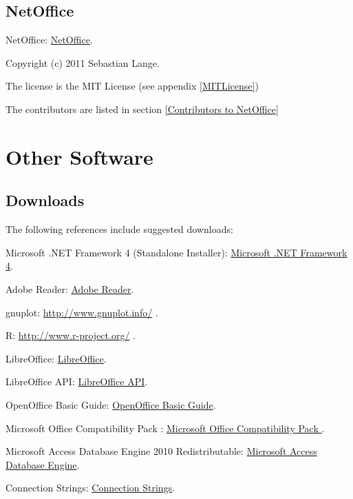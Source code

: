 \subsection{NetOffice}
NetOffice: \href{http://netoffice.codeplex.com/}{NetOffice}. 

Copyright (c) 2011 Sebastian Lange. 

The license is the MIT License (see appendix \ref{MITLicense})

The contributors are listed in section \ref{Contributors to NetOffice}







\newpage
\section{Other Software}



\subsection{Downloads}
The following references include suggested downloads:

Microsoft .NET Framework 4 (Standalone Installer): \href{http://www.microsoft.com/en-us/download/details.aspx?id=17718}{Microsoft .NET Framework 4}.

Adobe Reader: \href{http://get.adobe.com/uk/reader/}{Adobe Reader}.

gnuplot: \href{http://www.gnuplot.info/}{http://www.gnuplot.info/} .

R: \href{http://www.r-project.org/}{http://www.r-project.org/} .

LibreOffice: \href{http://www.libreoffice.org/}{LibreOffice}.

LibreOffice API: \href{http://api.libreoffice.org/}{LibreOffice API}.

OpenOffice Basic Guide: \href{http://wiki.openoffice.org/wiki/Documentation/BASIC_Guide}{OpenOffice Basic Guide}.

Microsoft Office Compatibility Pack : \href{http://www.microsoft.com/en-us/download/details.aspx?id=3}{Microsoft Office Compatibility Pack }.

Microsoft Access Database Engine 2010 Redistributable: \href{http://www.microsoft.com/en-us/download/details.aspx?id=13255}{Microsoft Access Database Engine}.

Connection Strings: \href{http://www.connectionstrings.com/}{Connection Strings}.


